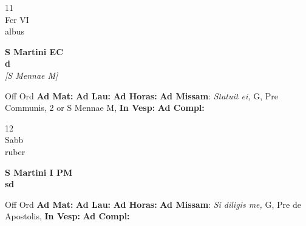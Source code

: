 \documentclass[10pt, openany]{book}
\begin{document}
        \begin{center}
            \begin{minipage}{3.5in}
                \vspace{2em}
                \begin{minipage}{0.5in}
                    {\Huge 11} \\
                    {\normalsize Fer VI} \\
                    {\normalsize albus}
                \end{minipage}
                \begin{minipage}{3.0in}
                    \textbf{ \large S Martini EC \\
                    \textnormal{\normalsize d}} \\ \textit{[S Mennae M]} \\ 
                \end{minipage}
                \begin{justify}Off Ord
                    \textbf{Ad Mat: }
                    \textbf{Ad Lau: }
                    \textbf{Ad Horas: }\textbf{Ad Missam}: \textit{Statuit ei,} G, Pre Communis, 2 or S Mennae M,  
                    \textbf{In Vesp: }
                    \textbf{Ad Compl: }
                \end{justify}
            \end{minipage}
        \end{center}
    
        \begin{center}
            \begin{minipage}{3.5in}
                \vspace{2em}
                \begin{minipage}{0.5in}
                    {\Huge 12} \\
                    {\normalsize Sabb} \\
                    {\normalsize ruber}
                \end{minipage}
                \begin{minipage}{3.0in}
                    \textbf{ \large S Martini I PM \\
                    \textnormal{\normalsize sd}} \\ 
                \end{minipage}
                \begin{justify}Off Ord
                    \textbf{Ad Mat: }
                    \textbf{Ad Lau: }
                    \textbf{Ad Horas: }\textbf{Ad Missam}: \textit{Si diligis me,} G, Pre de Apostolis,  
                    \textbf{In Vesp: }
                    \textbf{Ad Compl: }
                \end{justify}
            \end{minipage}
        \end{center}
    
\end{document}
